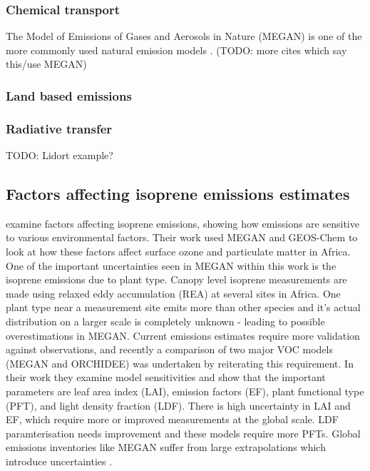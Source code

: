       
      
    \subsubsection{Chemical transport} %
      
      
      The Model of Emissions of Gases and Aerosols in Nature (MEGAN) is one of the more commonly used natural emission models \citep{Monks2015}. (TODO: more cites which say this/use MEGAN)
    
    \subsubsection{Land based emissions} %
      
      
      

    \subsubsection{Radiative transfer} %
      TODO: Lidort example?
    
  \subsection{Factors affecting isoprene emissions estimates}

      \cite{Marais2014} examine factors affecting isoprene emissions, showing how emissions are sensitive to various environmental factors.
      Their work used MEGAN \citep{Guenther1995} and GEOS-Chem to look at how these factors affect surface ozone and particulate matter in Africa.
      One of the important uncertainties seen in MEGAN within this work is the isoprene emissions due to plant type.
      Canopy level isoprene measurements are made using relaxed eddy accumulation (REA) at several sites in Africa.
      One plant type near a measurement site emits more than other species and it's actual distribution on a larger scale is completely unknown - leading to possible overestimations in MEGAN.
      Current emissions estimates require more validation against observations, and recently a comparison of two major VOC models (MEGAN and ORCHIDEE) was undertaken by \cite{Messina2016} reiterating this requirement.
      In their work they examine model sensitivities and show that the important parameters are leaf area index (LAI), emission factors (EF), plant functional type (PFT), and light density fraction (LDF).
      There is high uncertainty in LAI and EF, which require more or improved measurements at the global scale.
      LDF paramterisation needs improvement and these models require more PFTs.
      Global emissions inventories like MEGAN suffer from large extrapolations which introduce uncertainties \citep{Miller2014}.

